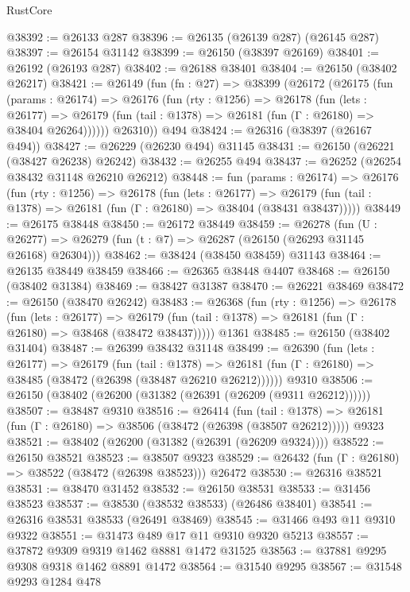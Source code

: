 \begin{lexlean}{RustCore}
\begin{coremodule}
@38392 := @26133 @287
@38396 := @26135 (@26139 @287) (@26145 @287)
@38397 := @26154 @31142
@38399 := @26150 (@38397 @26169)
@38401 := @26192 (@26193 @287)
@38402 := @26188 @38401
@38404 := @26150 (@38402 @26217)
@38421 := @26149
    (fun (fn : @27) =>
    @38399
      (@26172
        (@26175
          (fun (params : @26174) =>
          @26176
            (fun (rty : @1256) =>
            @26178
              (fun (lets : @26177) =>
              @26179 (fun (tail : @1378) => @26181 (fun (Γ : @26180) => @38404 @26264))))))
        @26310))
    @494
@38424 := @26316 (@38397 (@26167 @494))
@38427 := @26229 (@26230 @494) @31145
@38431 := @26150 (@26221 (@38427 @26238) @26242)
@38432 := @26255 @494
@38437 := @26252 (@26254 @38432 @31148 @26210 @26212)
@38448 := fun (params : @26174) =>
  @26176
    (fun (rty : @1256) =>
    @26178
      (fun (lets : @26177) =>
      @26179 (fun (tail : @1378) => @26181 (fun (Γ : @26180) => @38404 (@38431 @38437)))))
@38449 := @26175 @38448
@38450 := @26172 @38449
@38459 := @26278
    (fun (U : @26277) => @26279 (fun (t : @7) => @26287 (@26150 (@26293 @31145 @26168) @26304)))
@38462 := @38424 (@38450 @38459) @31143
@38464 := @26135 @38449 @38459
@38466 := @26365 @38448 @4407
@38468 := @26150 (@38402 @31384)
@38469 := @38427 @31387
@38470 := @26221 @38469
@38472 := @26150 (@38470 @26242)
@38483 := @26368
    (fun (rty : @1256) =>
    @26178
      (fun (lets : @26177) =>
      @26179 (fun (tail : @1378) => @26181 (fun (Γ : @26180) => @38468 (@38472 @38437)))))
    @1361
@38485 := @26150 (@38402 @31404)
@38487 := @26399 @38432 @31148
@38499 := @26390
    (fun (lets : @26177) =>
    @26179
      (fun (tail : @1378) =>
      @26181 (fun (Γ : @26180) => @38485 (@38472 (@26398 (@38487 @26210 @26212))))))
    @9310
@38506 := @26150 (@38402 (@26200 (@31382 (@26391 (@26209 (@9311 @26212))))))
@38507 := @38487 @9310
@38516 := @26414
    (fun (tail : @1378) => @26181 (fun (Γ : @26180) => @38506 (@38472 (@26398 (@38507 @26212)))))
    @9323
@38521 := @38402 (@26200 (@31382 (@26391 (@26209 @9324))))
@38522 := @26150 @38521
@38523 := @38507 @9323
@38529 := @26432 (fun (Γ : @26180) => @38522 (@38472 (@26398 @38523))) @26472
@38530 := @26316 @38521
@38531 := @38470 @31452
@38532 := @26150 @38531
@38533 := @31456 @38523
@38537 := @38530 (@38532 @38533) (@26486 @38401)
@38541 := @26316 @38531 @38533 (@26491 @38469)
@38545 := @31466 @493 @11 @9310 @9322
@38551 := @31473 @489 @17 @11 @9310 @9320 @5213
@38557 := @37872 @9309 @9319 @1462 @8881 @1472 @31525
@38563 := @37881 @9295 @9308 @9318 @1462 @8891 @1472
@38564 := @31540 @9295
@38567 := @31548 @9293 @1284 @478

\end{coremodule}
\end{lexlean}

